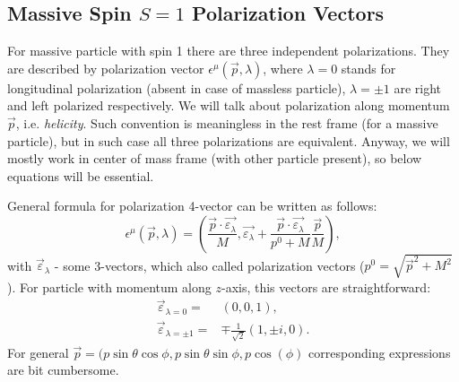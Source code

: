\documentclass[12pt]{revtex4-1}
\begin{document}
\begin{appendices}
\section{Massive Spin $S=1$ Polarization Vectors}\label{sec:polarization}

	For massive particle with spin 1 there are three independent polarizations.
	They are described by polarization vector $\epsilon^{\mu}(\vec{p}, \lambda)$,
	where $\lambda = 0$ stands for longitudinal polarization (absent in case
	of massless particle), $\lambda = \pm 1$ are right and left polarized 
	respectively.
	We will talk about polarization along  momentum $\vec{p}$, i.e. \textit{helicity}.
	Such convention is meaningless in the rest frame (for a massive particle),
	but in such case all three polarizations are equivalent. Anyway, we will
	mostly work in center of mass frame (with other particle present), so 
	below equations will be essential.

	General formula for polarization 4-vector can be written as follows:
	\begin{equation}
		\epsilon^{\mu}(\vec p, \lambda) = \left( \frac{\vec{p}\cdot 
		\vec{\varepsilon_{\lambda}}}{M} , \vec{\varepsilon_{\lambda}}
		+ \frac{\vec{p}\cdot 
		\vec{\varepsilon_{\lambda}}}{p^0 + M} \frac{\vec{p}}{M}
		\right),
	\end{equation}
	with $\vec{\varepsilon}_{\lambda}$ - some 3-vectors, which also called
	polarization vectors ($p^0 = \sqrt{\vec{p}^2 + M^2}$).
	For particle with momentum along $z$-axis, this vectors are straightforward:
	\begin{align} \label{eqn:polarization-3-vectors}
		\vec{\varepsilon}_{\lambda = 0}= & (0, 0 ,1), \\
		\vec{\varepsilon}_{\lambda = \pm 1}= & \mp \frac{1}{\sqrt{2}}(1, \pm i,0).
	\end{align}
	For general $\vec{p} = (p \sin\theta \cos\phi, p \sin\theta \sin\phi,
	p \cos(\phi)$ corresponding expressions are bit cumbersome.


\end{appendices}
\end{document}
